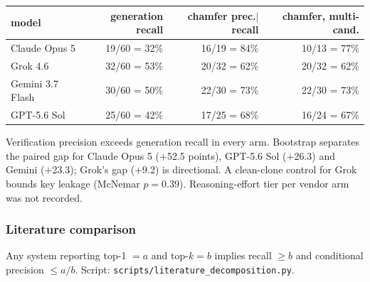 \begin{center}
\begin{minipage}{\linewidth}
\centering
{}
\small
\begin{tabular}{@{}lrrr@{}}
\toprule
model & generation recall & chamfer prec.$|$recall & chamfer, multi-cand. \\
\midrule
Claude Opus 5 & 19/60 = 32\% & 16/19 = 84\% & 10/13 = 77\% \\
Grok 4.6 & 32/60 = 53\% & 20/32 = 62\% & 20/32 = 62\% \\
Gemini 3.7 Flash & 30/60 = 50\% & 22/30 = 73\% & 22/30 = 73\% \\
GPT-5.6 Sol & 25/60 = 42\% & 17/25 = 68\% & 16/24 = 67\% \\
\bottomrule
\end{tabular}
\end{minipage}
\end{center}

Verification precision exceeds generation recall in every arm.
Bootstrap separates the paired gap for Claude Opus 5 ($+$52.5 points),
GPT-5.6 Sol ($+$26.3) and Gemini ($+$23.3); Grok's gap ($+$9.2) is
directional.
A clean-clone control for Grok bounds key leakage (McNemar $p{=}0.39$).
Reasoning-effort tier per vendor arm was not recorded.
\FloatBarrier

\subsubsection{Literature comparison}
\label{si:lit}

Any system reporting top-1 $= a$ and top-$k = b$ implies
recall $\geq b$ and conditional precision $\leq a/b$.
Script: \texttt{scripts/literature\_decomposition.py}.

